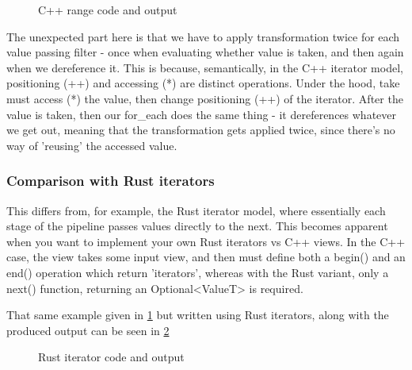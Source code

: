 \documentclass[
    english, %
]{VUMIFPSkursinis}
\begin{document}
\begin{figure}[!htbp]
    \begin{minipage}{0.5\textwidth}
        \centering
    \end{minipage}
    \begin{minipage}{0.5\textwidth}
        \centering
    \end{minipage}
    \caption{C++ range code and output}
    \label{fig:cpp_iter}
\end{figure}

The unexpected part here is that we have to apply transformation twice for each value passing filter - once when evaluating whether value is taken, and then again when we dereference it.
This is because, semantically, in the C++ iterator model, positioning (++) and accessing (*) are distinct operations. Under the hood, take must access (*) the value, then change positioning (++) of the iterator.
After the value is taken, then our for\_each does the same thing - it dereferences whatever we get out, meaning that the transformation gets applied twice, since there's no way of 'reusing' the accessed value.

\FloatBarrier
\subsubsection{Comparison with Rust iterators}

This differs from, for example, the Rust iterator model, where essentially each stage of the pipeline passes values directly to the next. This becomes apparent when you want to implement your own Rust iterators vs C++ views. In the C++ case, the view takes some input view, and then must define both a begin() and an end() operation which return 'iterators', whereas with the Rust variant, only a next() function, returning an Optional<ValueT> is required.

That same example given in \cref{fig:cpp_iter} but written using Rust iterators, along with the produced output can be seen in \cref{fig:rust_iter}

\begin{figure}[!htbp]
    \begin{minipage}{0.55\textwidth}
        \centering
    \end{minipage}
    \begin{minipage}{0.45\textwidth}
        \centering
    \end{minipage}
    \caption{Rust iterator code and output}
    \label{fig:rust_iter}
\end{figure}
\end{document}
